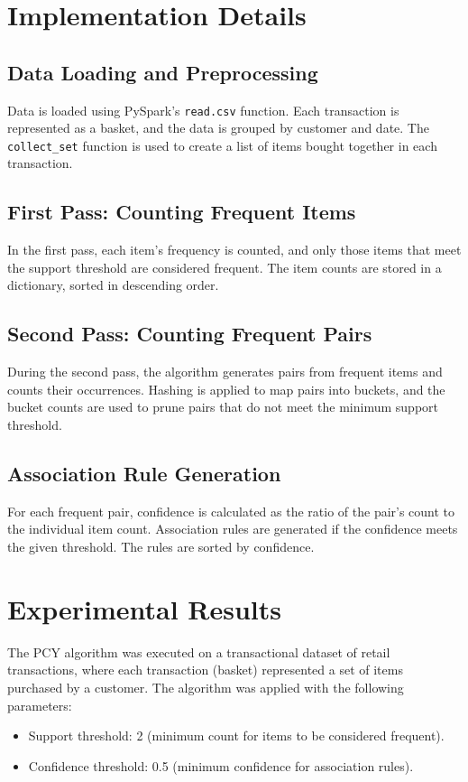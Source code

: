 \documentclass{article}
\begin{document}
\section{Implementation Details}

\subsection{Data Loading and Preprocessing}
Data is loaded using PySpark’s \texttt{read.csv} function. Each transaction is represented as a basket, and the data is grouped by customer and date. The \texttt{collect\_set} function is used to create a list of items bought together in each transaction.

\subsection{First Pass: Counting Frequent Items}
In the first pass, each item’s frequency is counted, and only those items that meet the support threshold are considered frequent. The item counts are stored in a dictionary, sorted in descending order.

\subsection{Second Pass: Counting Frequent Pairs}
During the second pass, the algorithm generates pairs from frequent items and counts their occurrences. Hashing is applied to map pairs into buckets, and the bucket counts are used to prune pairs that do not meet the minimum support threshold.

\subsection{Association Rule Generation}
For each frequent pair, confidence is calculated as the ratio of the pair’s count to the individual item count. Association rules are generated if the confidence meets the given threshold. The rules are sorted by confidence.

\section{Experimental Results}
The PCY algorithm was executed on a transactional dataset of retail transactions, where each transaction (basket) represented a set of items purchased by a customer. The algorithm was applied with the following parameters:
\begin{itemize}
    \item Support threshold: 2 (minimum count for items to be considered frequent).
    \item Confidence threshold: 0.5 (minimum confidence for association rules).
\end{itemize}
\end{document}
